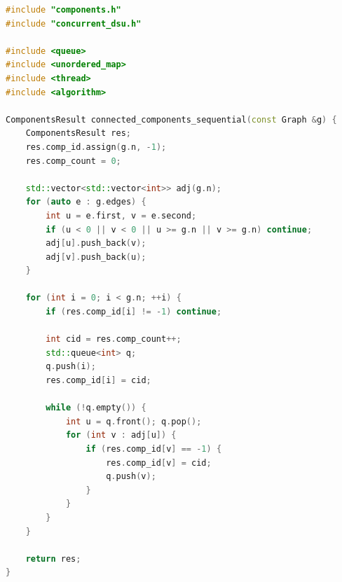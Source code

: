 \setcounter{lstlisting}{0}
\renewcommand{\thelstlisting}{А.\arabic{lstlisting}}
\renewcommand{\thetable}{A.\arabic{table}}
\setcounter{table}{0}

\begin{lstlisting}[language=C++,caption={Последовательный поиск компонент связности (BFS)},label={lst:cc_seq}]
#include "components.h"
#include "concurrent_dsu.h"

#include <queue>
#include <unordered_map>
#include <thread>
#include <algorithm>

ComponentsResult connected_components_sequential(const Graph &g) {
    ComponentsResult res;
    res.comp_id.assign(g.n, -1);
    res.comp_count = 0;

    std::vector<std::vector<int>> adj(g.n);
    for (auto e : g.edges) {
        int u = e.first, v = e.second;
        if (u < 0 || v < 0 || u >= g.n || v >= g.n) continue;
        adj[u].push_back(v);
        adj[v].push_back(u);
    }

    for (int i = 0; i < g.n; ++i) {
        if (res.comp_id[i] != -1) continue;

        int cid = res.comp_count++;
        std::queue<int> q;
        q.push(i);
        res.comp_id[i] = cid;

        while (!q.empty()) {
            int u = q.front(); q.pop();
            for (int v : adj[u]) {
                if (res.comp_id[v] == -1) {
                    res.comp_id[v] = cid;
                    q.push(v);
                }
            }
        }
    }

    return res;
}
\end{lstlisting}

